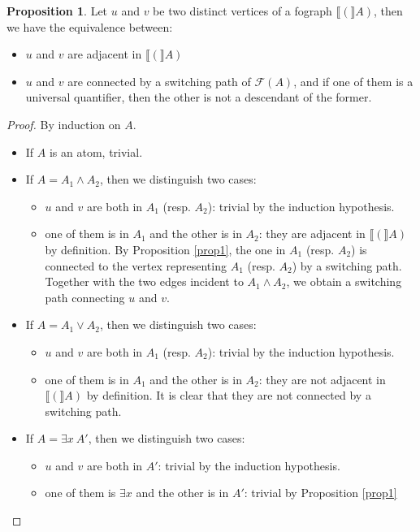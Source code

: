 \documentclass[conference,twosided,10pt]{IEEEtran}
\theoremstyle{definition}
\newtheorem{proposition}[thm]{Proposition}
\newcommand{\cor}{\vee}
\newcommand{\cand}{\wedge}
\newcommand{\graphof}[1]{\llbracket#1\rrbracket}
\newcommand{\formtree}[1]{\mathcal{F}(#1)}
\begin{document}
\begin{proposition}
\label{prop2}
Let $u$ and $v$ be two distinct vertices of a fograph $\graphof(A)$, then we have the equivalence
between:
\begin{itemize}
  \item $u$ and $v$ are adjacent in $\graphof(A)$
  \item $u$ and $v$ are connected by a switching path of $\formtree{A}$, and if one of them is a universal quantifier, then the other is
	not a descendant of the former.
  \end{itemize}
\begin{proof}
By induction on $A$.
\begin{itemize}
  \item If $A$ is an atom, trivial.
  \item If $A = A_1 \cand A_2$, then we distinguish two cases:
    \begin{itemize}
      \item $u$ and $v$ are both in $A_1$ (resp. $A_2$): trivial by
	      the induction hypothesis.
      \item one of them is in $A_1$ and the other is in $A_2$: they are
	      adjacent in $\graphof(A)$ by definition. By Proposition \ref{prop1},
		    the one in $A_1$ (resp. $A_2$) is connected to the
		    vertex representing $A_1$ (resp. $A_2$) by a switching
		    path. Together with the two edges incident to $A_1 \cand
		    A_2$, we obtain a switching path connecting $u$ and $v$.
    \end{itemize}
  \item If $A = A_1 \cor A_2$, then we distinguish two cases:
    \begin{itemize}
      \item $u$ and $v$ are both in $A_1$ (resp. $A_2$): trivial by
	      the induction hypothesis.
      \item one of them is in $A_1$ and the other is in $A_2$: they are not
	      adjacent in $\graphof(A)$ by definition. It is clear that they
		    are not connected by a switching path.
    \end{itemize}
  \item If $A = \exists x \ A'$, then we distinguish two cases:
    \begin{itemize}
      \item $u$ and $v$ are both in $A'$: trivial by the induction
	      hypothesis.
      \item one of them is $\exists x$ and the other is in $A'$: trivial
	      by Proposition \ref{prop1}


\end{itemize}
\end{itemize}
\end{proof}
\end{proposition}
\end{document}
